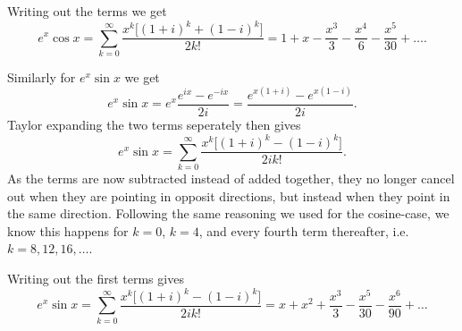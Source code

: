 \documentclass[a4paper, 11pt, titlepage, english]{article}
\begin{document}
Writing out the terms we get
$$e^x\cos x = \sum_{k=0}^\infty \frac{x^k\big[ (1+i)^k + (1-i)^k\big]}{2k!} = 1 + x - \frac{x^3}{3} - \frac{x^4}{6} - \frac{x^5}{30} + \ldots.$$

\clearpage

Similarly for $e^x \sin x$ we get
$$e^x \sin x = e^x \frac{e^{ix} - e^{-ix}}{2i} = \frac{e^{x(1+i)} - e^{x(1-i)}}{2i}.$$
Taylor expanding the two terms seperately then gives
$$e^x\sin x = \sum_{k=0}^\infty \frac{x^k\big[ (1+i)^k - (1-i)^k\big]}{2ik!}.$$
As the terms are now subtracted instead of added together, they no longer cancel out when they are pointing in opposit directions, but instead when they point in the same direction. Following the same reasoning we used for the cosine-case, we know this happens for $k=0$, $k=4$, and every fourth term thereafter, i.e.\ $k=8,12,16,\ldots$.

Writing out the first terms gives
$$e^x\sin x = \sum_{k=0}^\infty \frac{x^k\big[ (1+i)^k - (1-i)^k\big]}{2ik!} = x + x^2 + \frac{x^3}{3} - \frac{x^5}{30} - \frac{x^6}{90} + \ldots$$

 
\end{document}

